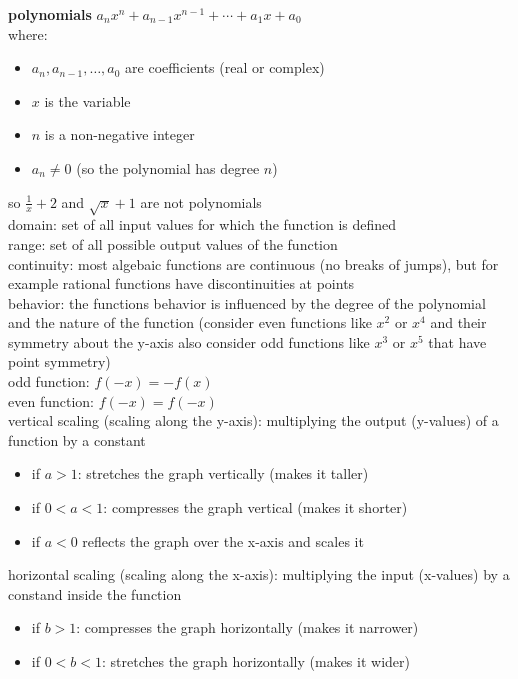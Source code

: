 \documentclass{article}
\begin{document}
\textbf{polynomials}
$a_nx^n + a_{n-1}x^{n-1} + \cdots + a_1x + a_0$\\
where:
	\begin{itemize}
		\item $a_n, a_{n-1}, \ldots, a_0$ are coefficients (real or complex)
		\item $x$ is the variable
		\item $n$ is a non-negative integer
		\item $a_n \neq 0$ (so the polynomial has degree $n$)
	\end{itemize}

so $\frac{1}{x} + 2$ and $\sqrt{x} + 1$ are not polynomials\\

domain: set of all input values for which the function is defined\\

range: set of all possible output values of the function\\

continuity: most algebaic functions are continuous (no breaks of jumps), but for example rational functions have discontinuities at points\\

behavior: the functions behavior is influenced by the degree of the polynomial and the nature of the function (consider even functions like $x^2$ or $x^4$ and their symmetry about the y-axis also consider odd functions like $x^3$ or $x^5$ that have point symmetry)\\

odd function: $f(-x) = -f(x)$\\
even function: $f(-x) = f(-x)$\\

vertical scaling (scaling along the y-axis): multiplying the output (y-values) of a function by a constant
	\begin{itemize}
		\item if $a > 1$: stretches the graph vertically (makes it taller)
		\item if $0 < a < 1$: compresses the graph vertical (makes it shorter)
		\item if $a < 0$ reflects the graph over the x-axis and scales it
	\end{itemize}

horizontal scaling (scaling along the x-axis): multiplying the input (x-values) by a constand inside the function
	\begin{itemize}
		\item if $b > 1$: compresses the graph horizontally (makes it narrower)
		\item if $0 < b < 1$: stretches the graph horizontally (makes it wider)
	\end{itemize}
\end{document}
